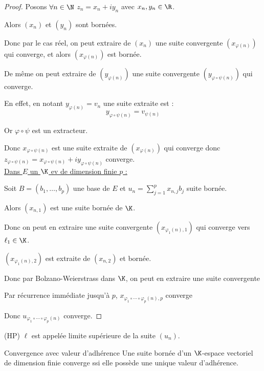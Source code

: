 \begin{proof}
    Posons $\forall n \in \N$ $z_n = x_n + i y_n$ avec $x_n, y_n \in \R$.

    Alors $(x_n)$ et $(y_n)$ sont bornées.

    Donc par le cas réel, on peut extraire de $(x_n)$ une suite convergente $(x_{\varphi(n)})$
    qui converge, et alors $(x_{\varphi(n)})$ est bornée. 

    De même on peut extraire de $(y_{\varphi(n)})$ une suite convergente $(y_{\varphi \circ \psi(n)})$ 
    qui converge. 

    En effet, en notant $y_{\varphi(n)} = v_n$ une suite extraite est :
    \[y_{\varphi \circ \psi(n)} = v_{\psi(n)}\]

    Or $\varphi \circ \psi$ est un extracteur.

    Donc $x_{\varphi \circ \psi(n)}$ est une suite extraite de $(x_{\varphi(n)})$ qui converge
    donc $z_{\varphi \circ \psi(n)} = x_{\varphi \circ \psi(n)} + i y_{\varphi \circ \psi(n)}$ converge. \\

    \uline{Dans $E$ un $\K$ ev de dimension finie $p$ :}

    \svspace Soit $B = (b_1, \dots, b_p)$ une base de $E$
    et $u_n = \sum_{j = 1}^{p} x_{n, j} b_j$ suite bornée. 

    Alors $(x_{n, 1})$ est une suite bornée de $\K$.    

    Donc on peut en extraire une suite convergente $(x_{\varphi_1(n), 1})$ 
    qui converge vers $\ell_1 \in \K$.

    $(x_{\varphi_1(n), 2})$ est extraite de $(x_{n, 2})$ et bornée.

    Donc par Bolzano-Weierstrass dans $\K$, on peut en extraire une suite convergente

    Par récurrence immédiate jusqu'à $p$,
    $x_{\varphi_1 \circ \cdots \circ \varphi_p(n), p}$ converge 

    Donc $u_{\varphi_1 \circ \cdots \circ \varphi_p(n)}$ converge. 
\end{proof}

\begin{remarque} (HP) $\ell$ est appelée limite supérieure de la suite $(u_n)$.
\end{remarque}

\begin{theoreme}{Convergence avec valeur d'adhérence}{}
    Une suite bornée d'un $\K$-espace vectoriel de dimension finie converge ssi elle possède
    une unique valeur d'adhérence.
\end{theoreme}

